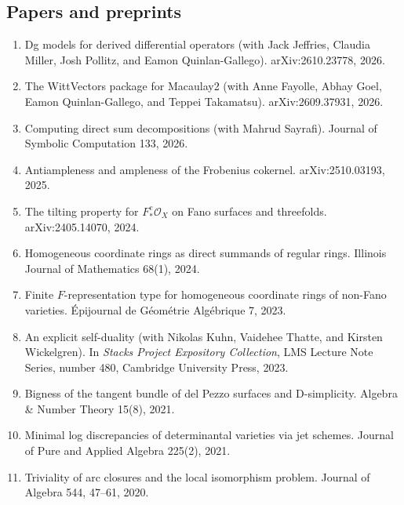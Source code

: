 \documentclass{res}
\begin{document}
\begin{resume}
\section{Papers and preprints} 
%
\begin{enumerate}
\item Dg models for derived differential operators (with Jack Jeffries, Claudia Miller, Josh Pollitz, and Eamon Quinlan-Gallego). arXiv:2610.23778, 2026.
\item The WittVectors package for Macaulay2 (with Anne Fayolle, Abhay Goel, Eamon Quinlan-Gallego, and Teppei Takamatsu). arXiv:2609.37931, 2026.
\item Computing direct sum decompositions (with Mahrud Sayrafi). Journal of Symbolic Computation 133, 2026.
\item Antiampleness and ampleness of the Frobenius cokernel. arXiv:2510.03193, 2025.
\item The tilting property for $F_*^e\mathcal O_X$ on Fano surfaces and threefolds. arXiv:2405.14070, 2024.
\item Homogeneous coordinate rings as direct summands of regular rings. Illinois Journal of Mathematics 68(1), 2024.
\item Finite $F$-representation type for homogeneous coordinate rings of non-Fano varieties. \'Epijournal de G\'eom\'etrie Alg\'ebrique 7, 2023.
\item An explicit self-duality (with Nikolas Kuhn, Vaidehee Thatte, and Kirsten Wickelgren). In \emph{Stacks Project Expository Collection}, LMS Lecture Note Series, number 480, Cambridge University Press, 2023.
\item Bigness of the tangent bundle of del Pezzo surfaces and D-simplicity. Algebra \& Number Theory 15(8), 2021.
\item
Minimal log discrepancies of determinantal varieties via jet schemes. Journal of Pure and Applied Algebra 225(2), 2021.
\item
Triviality of arc closures and the local isomorphism problem. Journal of Algebra 544, 47--61, 2020.
\end{enumerate}


\end{resume}
\end{document}
